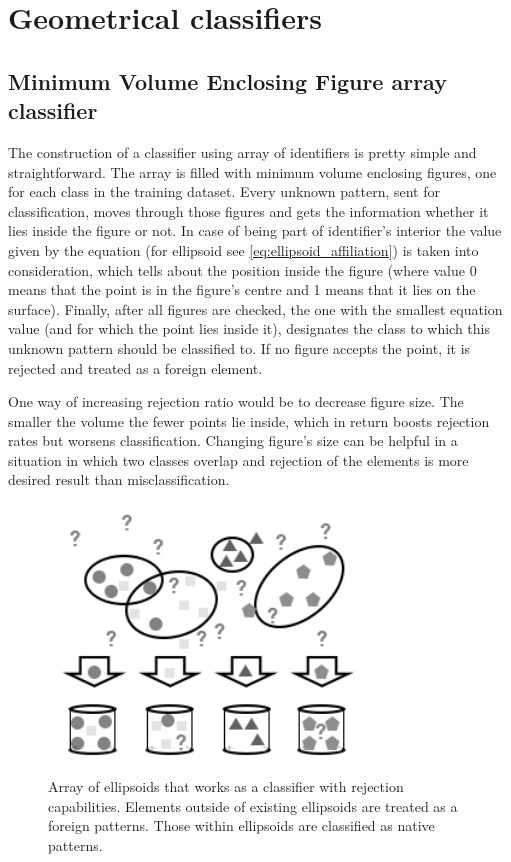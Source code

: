 \section{Geometrical classifiers}

\subsection{Minimum Volume Enclosing Figure array classifier}

The construction of a classifier using array of identifiers is pretty simple and straightforward. The array is filled with minimum volume enclosing figures, one for each class in the training dataset. Every unknown pattern, sent for classification, moves through those figures and gets the information whether it lies inside the figure or not. In case of being part of identifier's interior the value given by the equation (for ellipsoid see \ref{eq:ellipsoid_affiliation}) is taken into consideration, which tells about the position inside the figure (where value 0 means that the point is in the figure's centre and 1 means that it lies on the surface). Finally, after all figures are checked, the one with the smallest equation value (and for which the point lies inside it), designates the class to which this unknown pattern should be classified to. If no figure accepts the point, it is rejected and treated as a foreign element. 

One way of increasing rejection ratio would be to decrease figure size. The smaller the volume the fewer points lie inside, which in return boosts rejection rates but worsens classification. Changing figure's size can be helpful in a situation in which two classes overlap and rejection of the elements is more desired result than misclassification.

\begin{figure}[htp]
	\centering
	\includegraphics[width=0.75\textwidth]{Figures/ellipsoid_classification.jpg}
	\caption{ Array of ellipsoids that works as a classifier with rejection capabilities. Elements outside of existing ellipsoids are treated as a foreign patterns. Those within ellipsoids are classified as native patterns. }
	\label{fig:ellipsoids_array}\vspace{-3pt}
\end{figure}

